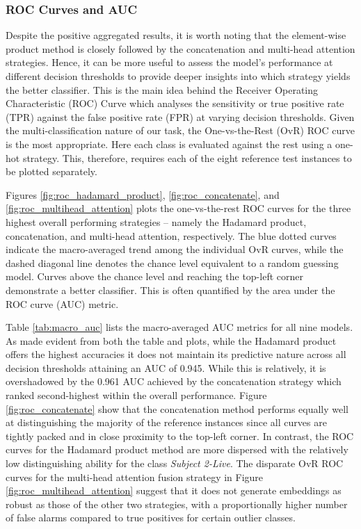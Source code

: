 \documentclass{mpaper}
\begin{document}
\subsubsection{ROC Curves and AUC}
Despite the positive aggregated results, it is worth noting that the element-wise product method is closely followed by the concatenation and multi-head attention strategies. Hence, it can be more useful to assess the model's performance at different decision thresholds to provide deeper insights into which strategy yields the better classifier. This is the main idea behind the Receiver Operating Characteristic (ROC) Curve which analyses the sensitivity or true positive rate (TPR) against the false positive rate (FPR) at varying decision thresholds. Given the multi-classification nature of our task, the One-vs-the-Rest (OvR) ROC curve is the most appropriate. Here each class is evaluated against the rest using a one-hot strategy. This, therefore, requires each of the eight reference test instances to be plotted separately.

Figures \ref{fig:roc_hadamard_product}, \ref{fig:roc_concatenate}, and \ref{fig:roc_multihead_attention} plots the one-vs-the-rest ROC curves for the three highest overall performing strategies -- namely the Hadamard product, concatenation, and multi-head attention, respectively. The blue dotted curves indicate the macro-averaged trend among the individual OvR curves, while the dashed diagonal line denotes the chance level equivalent to a random guessing model. Curves above the chance level and reaching the top-left corner demonstrate a better classifier. This is often quantified by the area under the ROC curve (AUC) metric.

Table \ref{tab:macro_auc} lists the macro-averaged AUC metrics for all nine models. As made evident from both the table and plots, while the Hadamard product offers the highest accuracies it does not maintain its predictive nature across all decision thresholds attaining an AUC of 0.945. While this is relatively, it is overshadowed by the 0.961 AUC achieved by the concatenation strategy which ranked second-highest within the overall performance. Figure \ref{fig:roc_concatenate} show that the concatenation method performs equally well at distinguishing the majority of the reference instances since all curves are tightly packed and in close proximity to the top-left corner. In contrast, the ROC curves for the Hadamard product method are more dispersed with the relatively low distinguishing ability for the class \textit{Subject 2-Live}. The disparate OvR ROC curves for the multi-head attention fusion strategy in Figure \ref{fig:roc_multihead_attention} suggest that it does not generate embeddings as robust as those of the other two strategies, with a proportionally higher number of false alarms compared to true positives for certain outlier classes.
\end{document}
